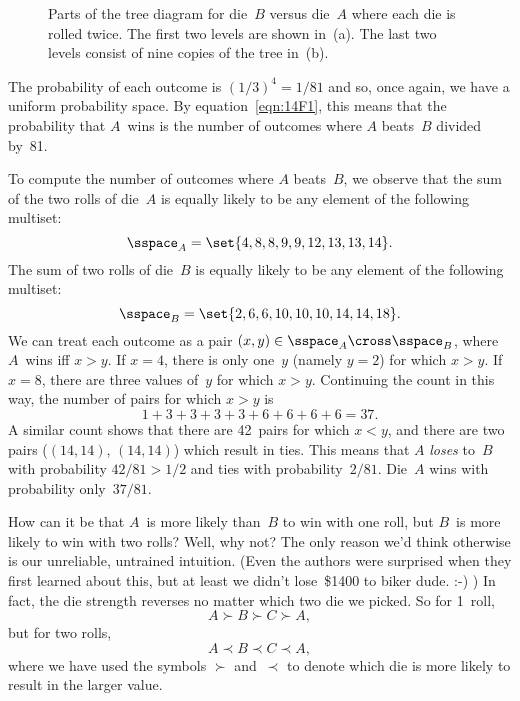 \begin{figure}


\caption{Parts of the tree diagram for die~$B$ versus die~$A$ where
  each die is rolled twice.  The first two levels are shown in~(a).
  The last two levels consist of nine copies of the tree in~(b).}

\label{fig:14A11}

\end{figure}

The probability of each outcome is $(1/3)^4 = 1/81$ and so, once
again, we have a uniform probability space.  By
equation~\eqref{eqn:14F1}, this means that the probability that
$A$~wins is the number of outcomes where $A$ beats~$B$ divided by~81.

To compute the number of outcomes where $A$ beats~$B$, we observe that
the sum of the two rolls of die~$A$ is equally likely to be any
element of the following multiset:
\begin{equation*}
    \sspace_A = \set{ 4, 8, 8, 9, 9, 12, 13, 13, 14 }.
\end{equation*}
The sum of two rolls of die~$B$ is equally likely to be any element of
the following multiset:
\begin{equation*}
    \sspace_B = \set{ 2, 6, 6, 10, 10, 10, 14, 14, 18 }.
\end{equation*}
We can treat each outcome as a pair $(x, y) \in \sspace_A
\cross \sspace_B$, where $A$~wins iff $x > y$.  If $x = 4$, there is
only one~$y$ (namely $y = 2$) for which $x > y$.  If $x = 8$, there
are three values of~$y$ for which $x > y$.  Continuing the count in
this way, the number of pairs for which $x > y$ is
\begin{equation*}
    1 + 3 + 3 + 3 + 3 + 6 + 6 + 6 + 6 = 37.
\end{equation*}
A similar count shows that there are 42~pairs for which $x < y$, and
there are two pairs ($(14, 14)$, $(14, 14)$) which result in ties.
This means that $A$ \emph{loses} to~$B$ with probability $42/81 > 1/2$
and ties with probability~$2/81$.  Die~$A$ wins with probability
only~$37/81$.

How can it be that $A$~is more likely than~$B$ to win with one roll,
but $B$~is more likely to win with two rolls?  Well, why not?  The
only reason we'd think otherwise is our unreliable, untrained
intuition.  (Even the authors were surprised when they first learned
about this, but at least we didn't lose~\$1400 to biker dude. :-) )  In
fact, the die strength reverses no matter which two die we picked.  So
for 1~roll,
\begin{equation*}
    A \succ B \succ C \succ A,
\end{equation*}
but for two rolls,
\begin{equation*}
    A \prec B \prec C \prec A,
\end{equation*}
where we have used the symbols $\succ$ and~$\prec$ to denote which die
is more likely to result in the larger value.

